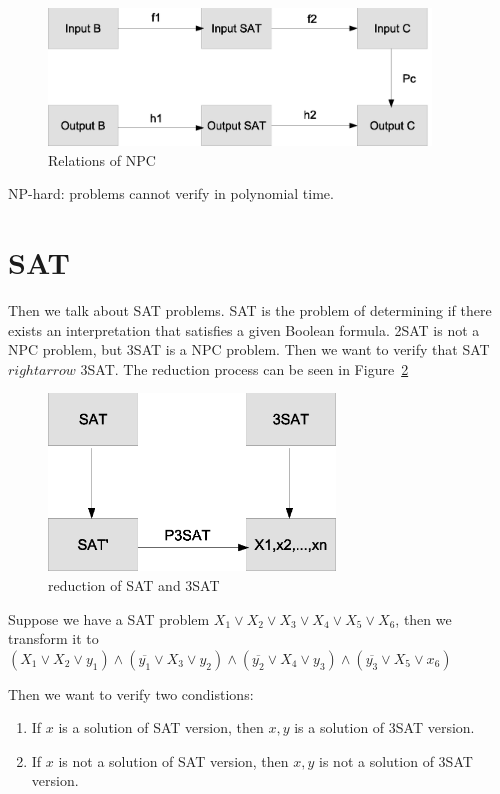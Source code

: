 \documentclass[usletter]{article}
\begin{document}
\begin{figure}[bht]
\begin{center}
     \includegraphics[width=4.0in]{figures/SATC}
\caption{\label{fig:relation-npc}Relations of NPC}
\end{center}
\end{figure}

NP-hard: problems cannot verify in polynomial time.

\section{SAT}
Then we talk about SAT problems. SAT is the problem of determining if there exists an interpretation that satisfies a given Boolean formula.
2SAT is not a NPC problem, but 3SAT is a NPC problem.
Then we want to verify that SAT $rightarrow$ 3SAT. The reduction process can be seen in Figure~\ref{fig:reduction-sat}

\begin{figure}[bht]
\begin{center}
     \includegraphics[width=3.0in]{figures/reduction-sat}
\caption{\label{fig:reduction-sat}reduction of SAT and 3SAT}
\end{center}
\end{figure}

Suppose we have a SAT problem $X_1 \vee X_2\vee X_3 \vee X_4\vee X_5\vee X_6$, then we transform it to 
$(X_1 \vee X_2 \vee y_1) \wedge (\overline{y_1} \vee X_3 \vee y_2) \wedge (\overline{y_2} \vee X_4 \vee y_3) \wedge (\overline{y_3} \vee X_5 \vee x_6)$ 

Then we want to verify two condistions:
\begin{enumerate}
	\item If ${x}$ is a solution of SAT version, then ${x,y}$ is a solution of 3SAT version.
	\item If ${x}$ is not a solution of SAT version, then ${x,y}$ is not a solution of 3SAT version.
\end{enumerate}
\end{document}
